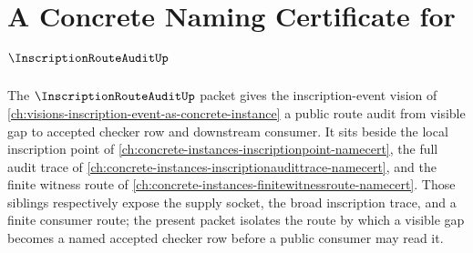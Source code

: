\chapter{A Concrete Naming Certificate for $\InscriptionRouteAuditUp$}
\label{ch:concrete-instances-inscription-route-audit-namecert}

The $\InscriptionRouteAuditUp$ packet gives the inscription-event vision of
\autoref{ch:visions-inscription-event-as-concrete-instance} a public route
audit from visible gap to accepted checker row and downstream consumer. It
sits beside the local inscription point of
\autoref{ch:concrete-instances-inscriptionpoint-namecert}, the full audit
trace of \autoref{ch:concrete-instances-inscriptionaudittrace-namecert}, and
the finite witness route of
\autoref{ch:concrete-instances-finitewitnessroute-namecert}. Those siblings
respectively expose the supply socket, the broad inscription trace, and a
finite consumer route; the present packet isolates the route by which a
visible gap becomes a named accepted checker row before a public consumer may
read it.

